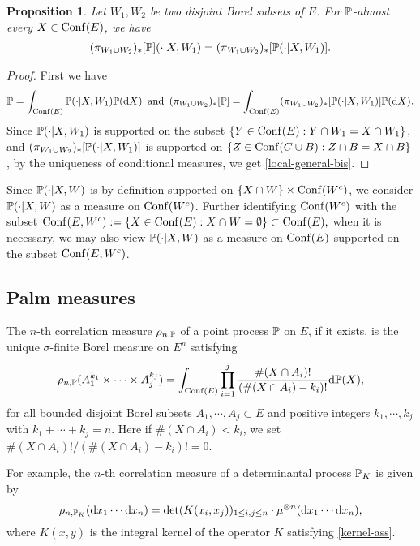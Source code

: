 \documentclass[12pt]{paper}
\newtheorem{proposition}[theorem]{Proposition}
\numberwithin{theorem}{section}
\numberwithin{figure}{section}
\numberwithin{equation}{section}
\begin{document}
\begin{proposition}\label{prop-local-meas}
Let $W_1, W_2$ be two disjoint Borel subsets of $E$.  For $\mathbb{P}$-almost every $X\in \mathrm{Conf}(E)$, we have
\begin{align}\label{local-general-bis}
(\pi_{W_1\cup W_2})_{*}[\mathbb{P}] (\cdot | X, W_1)  = ( \pi_{W_1\cup W_2})_{*} [\mathbb{P}(\cdot| X, W_1)].
\end{align}

\end{proposition}
\begin{proof}
First we have
\begin{align*}
\mathbb{P} = \int_{\mathrm{Conf}(E)}       \mathbb{P}(\cdot| X, W_1) \mathbb{P}(\mathrm{d} X) \text{\, and \,} (\pi_{W_1\cup W_2})_{*} [\mathbb{P}] = \int_{\mathrm{Conf}(E)}    (\pi_{W_1\cup W_2})_{*}  [  \mathbb{P}(\cdot| X, W_1) ] \mathbb{P}(\mathrm{d} X).
\end{align*}
Since $\mathbb{P}(\cdot | X, W_1)$ is supported on the subset $\{Y \in \mathrm{Conf}(E):   Y \cap W_1 = X \cap W_1\}$, and $(\pi_{W_1\cup W_2} )_{*} [  \mathbb{P}(\cdot| X, W_1) ]$ is supported on $\{Z\in \mathrm{Conf}(C \cup B):  Z \cap B = X \cap B\}$, by the uniqueness of conditional measures, we get \eqref{local-general-bis}.
\end{proof}
Since $\mathbb{P}(\cdot| X, W)$ is by definition supported on $\{X\cap W\} \times \mathrm{Conf}(W^c)$, we consider $\mathbb{P}(\cdot| X, W)$ as a measure on $\mathrm{Conf}(W^c)$. Further identifying $\mathrm{Conf}(W^c)$ with the subset
$
\mathrm{Conf}(E, W^c): =  \{X \in \mathrm{Conf}(E): X \cap W = \emptyset\}
 \subset \mathrm{Conf}(E),
$
when it is necessary, we may also view $\mathbb{P}(\cdot| X, W)$ as a measure on $\mathrm{Conf}(E)$ supported  on the subset $\mathrm{Conf}(E, W^c)$.

\subsection{Palm measures}\label{sec-palm-cond}


The $n$-th correlation measure $\rho_{n, \mathbb{P}}$ of a point process $\mathbb{P}$ on $E$, if it exists, is the unique $\sigma$-finite Borel measure on $E^n$ satisfying
\[
\rho_{n, \mathbb{P}} (A_1^{k_1} \times  \cdots \times A_j^{k_j})  =  \int_{\mathrm{Conf}(E)}   \prod_{i =1}^j  \frac{ \#(X \cap A_i)!}{( \# (X \cap A_i)  - k_i)! } \mathrm{d}\mathbb{P}( X),
\]
for all bounded disjoint Borel subsets $A_1, \cdots, A_j \subset E$ and positive integers $k_1, \cdots, k_j$ with $k_1 + \cdots + k_j = n$.  Here if $ \#(X \cap A_i)<k_i$, we set $\#(X \cap A_i)!/( \#(X \cap A_i) - k_i)! = 0$.

For example, the $n$-th correlation measure of a determinantal process $\mathbb{P}_K$ is given by
\[
\rho_{n, \mathbb{P}_{K}}  (\mathrm{d} x_1 \cdots \mathrm{d} x_n) = \det(K(x_i, x_j))_{1\le i, j \le n}  \cdot \mu^{\otimes n} (\mathrm{d} x_1 \cdots \mathrm{d} x_n),
\]
where $K(x, y)$ is the integral kernel of the operator $K$ satisfying \eqref{kernel-ass}.
\end{document}
